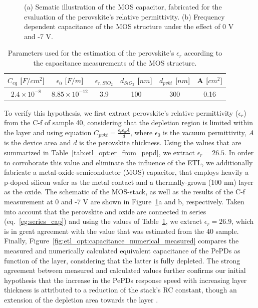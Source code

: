 \begin{figure}[htbp]
    \caption{(a) Sematic illustration of the MOS capacitor, fabricated for the evaluation of the perovskite's relative permittivity. (b) Frequency dependent capacitance of the MOS structure under the effect of 0 V and -7 V. }
    \label{etl:mos_stack}
\end{figure}


\begin{table}[htbp]
    \centering
    \caption{Parameters used for the estimation of the perovskite’s $\epsilon_r$ according to the capacitance measurements of the MOS structure.}
    \renewcommand{\arraystretch}{1.5}
    \begin{tabular}{| c | c | c | c | c | c |}
        \hline
        $C_{eq}$ [$F/cm^2$] & $\epsilon_0$ [$F/m$] & $\epsilon_{r,SiO_2}$ & $d_{SiO_2}$ [$nm$] & $d_{pvkt}$ [$nm$] & A [$cm^2$] \\
        \hline
        $2.4\times10^{-8}$ & $8.85\times10^{-12}$ & 3.9 & 100 & 300 & 0.16 \\
        \hline
    \end{tabular}
    
    \label{tab:etl_opt:er_from_mos}
\end{table}



To verify this hypothesis, we first extract perovskite's relative permittivity ($\epsilon_r$) from the C-f of sample 40, considering that the depletion region is limited within the  layer and using equation $C_{pvkt} = \frac{\epsilon_r\epsilon_0A}{d}$, where $\epsilon_0$ is the vacuum permittivity, $A$ is the device area and $d$ is the perovskite thickness. Using the values that are summarized in Table~\ref{tab:etl_opt:er_from_pepd}, we extract $\epsilon_r = 26.5$. In order to corroborate this value and eliminate the influence of the ETL, we additionally fabricate a metal-oxide-semiconductor (MOS) capacitor, that employs heavily a p-doped silicon wafer as the metal contact and a thermally-grown  (100 nm) layer as the oxide. The schematic of the MOS-stack, as well as the results of the C-f measurement at 0 and -7 V are shown in Figure~\ref{etl:mos_stack}a and b, respectively. Taken into account that the perovskite and oxide are connected in series (eq.~\ref{eg:series_cap}) and using the values of Table~\ref{tab:etl_opt:er_from_mos}, we extract $\epsilon_r = 26.9$, which is in great agreement with the value that was estimated from the 40 sample. Finally, Figure~\ref{fig:etl_opt:capacitance_numerical_measured} compares the measured and numerically calculated equivalent capacitance of the PePDs as function of the  layer, considering that the latter is fully depleted. The strong agreement between measured and calculated values further confirms our initial hypothesis that the increase in the PePDs response speed with increasing  layer thickness is attributed to a reduction of the stack's RC constant, though an extension of the depletion area towards the  layer \cite{Goushcha2017OnPhotodiodes}. 


